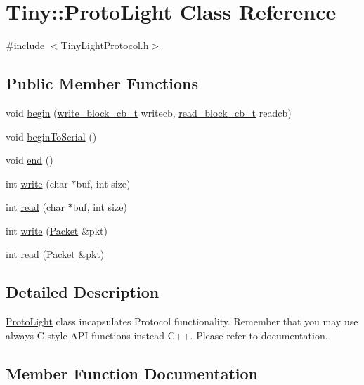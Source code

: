 \hypertarget{classTiny_1_1ProtoLight}{}\section{Tiny\+:\+:Proto\+Light Class Reference}
\label{classTiny_1_1ProtoLight}


{\ttfamily \#include $<$Tiny\+Light\+Protocol.\+h$>$}

\subsection*{Public Member Functions}
\begin{DoxyCompactItemize}
\item 
void \hyperlink{classTiny_1_1ProtoLight_ad27dfcef54a8316228469ef0a4267962}{begin} (\hyperlink{tiny__layer2_8h_a7f69e669de5baa69a43ee5cb439a7496}{write\+\_\+block\+\_\+cb\+\_\+t} writecb, \hyperlink{tiny__layer2_8h_ae3d867e030f59de94508902f2b84a7ec}{read\+\_\+block\+\_\+cb\+\_\+t} readcb)
\item 
void \hyperlink{classTiny_1_1ProtoLight_a50bf63fe1891edda48980ca2893485d7}{begin\+To\+Serial} ()
\item 
void \hyperlink{classTiny_1_1ProtoLight_a948b2a0e37177b7434581adc64b36497}{end} ()
\item 
int \hyperlink{classTiny_1_1ProtoLight_a46a27ee9d0b55c88672c98abf04dbdce}{write} (char $\ast$buf, int size)
\item 
int \hyperlink{classTiny_1_1ProtoLight_acf18a8b73ee6c6394270c903ad7882b8}{read} (char $\ast$buf, int size)
\item 
int \hyperlink{classTiny_1_1ProtoLight_abf2966531f8ed7dba44079f00eefded2}{write} (\hyperlink{classTiny_1_1Packet}{Packet} \&pkt)
\item 
int \hyperlink{classTiny_1_1ProtoLight_a96c56b10b4eee28c09b291461c66fa54}{read} (\hyperlink{classTiny_1_1Packet}{Packet} \&pkt)
\end{DoxyCompactItemize}


\subsection{Detailed Description}
\hyperlink{classTiny_1_1ProtoLight}{Proto\+Light} class incapsulates Protocol functionality. Remember that you may use always C-\/style A\+P\+I functions instead C++. Please refer to documentation. 

\subsection{Member Function Documentation}
\hypertarget{classTiny_1_1ProtoLight_ad27dfcef54a8316228469ef0a4267962}{}
